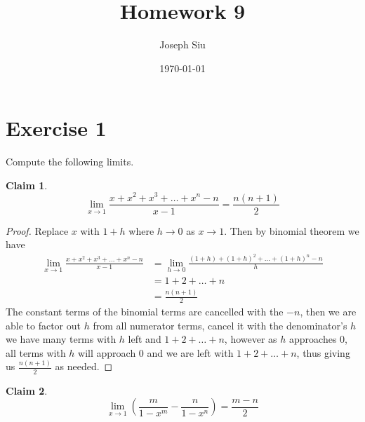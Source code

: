 \documentclass{homework}
\author{Joseph Siu}
\date{\today}
\title{Homework 9}
\newcommand{\ra}{\rightarrow}
\newcommand{\?}{\stackrel{?}{=}}
\theoremstyle{definition}
\newtheorem*{claim}{Claim}
\begin{document}
 \maketitle

\section*{Exercise 1}

Compute the following limits.

\question[1] 

\begin{claim}
\[\lim_{x\to1}\frac{x+x^2+x^3+\ldots+x^n-n}{x-1}=\frac{n(n+1)}{2}\]
\end{claim}

\begin{proof}
    Replace $x$ with $1+h$ where $h\to0$ as $x\to1$. Then by binomial theorem we have \begin{align*}
        \lim_{x\to1}\frac{x+x^2+x^3+\ldots+x^n-n}{x-1}&=\lim_{h\to0}\frac{(1+h)+(1+h)^2+\ldots+(1+h)^n-n}{h}\\
        &=1+2+\ldots+n\\
        &=\frac{n(n+1)}{2}
    \end{align*} 
    The constant terms of the binomial terms are cancelled with the $-n$, then we are able to factor out $h$ from all numerator terms, cancel it with the denominator's $h$ we have many terms with $h$ left and $1+2+\ldots+n$, however as $h$ approaches $0$, all terms with $h$ will approach $0$ and we are left with $1+2+\ldots+n$, thus giving us $\frac{n(n+1)}{2}$ as needed.
\end{proof}

\question[2] 

\begin{claim}
    \[\lim_{x\ra1}\left( \frac{m}{1-x^m}-\frac{n}{1-x^n} \right)=\frac{m-n}{2}\]
\end{claim}
\end{document}
